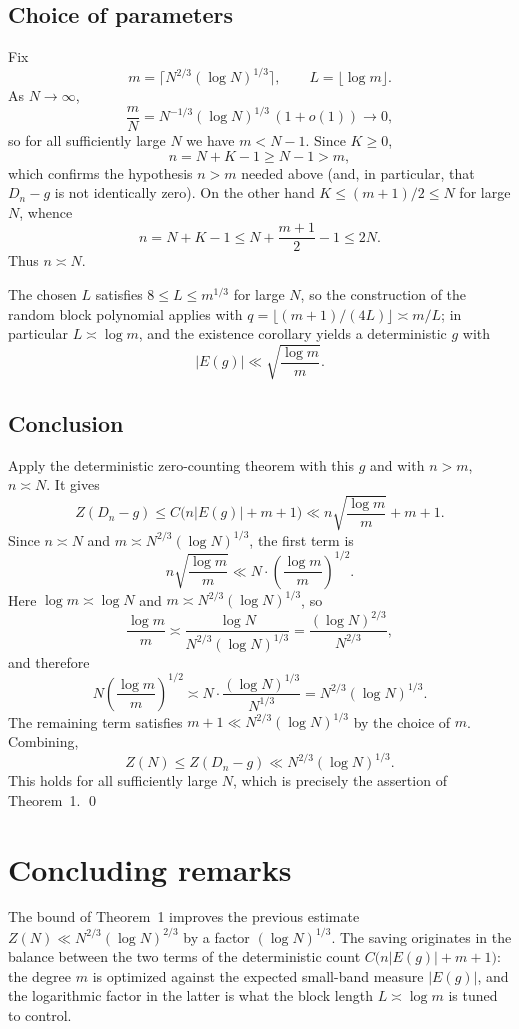 \documentclass[11pt,reqno]{amsart}
\theoremstyle{plain}
\theoremstyle{definition}
\theoremstyle{remark}
\begin{document}
\subsection*{Choice of parameters}

Fix
\[
m=\big\lceil N^{2/3}(\log N)^{1/3}\big\rceil,\qquad L=\lfloor\log m\rfloor .
\]
As $N\to\infty$,
\[
\frac{m}{N}=N^{-1/3}(\log N)^{1/3}\,(1+o(1))\longrightarrow 0,
\]
so for all sufficiently large $N$ we have $m<N-1$. Since $K\ge 0$,
\[
n=N+K-1\ge N-1>m,
\]
which confirms the hypothesis $n>m$ needed above (and, in particular, that $D_n-g$ is not identically zero). On the other hand $K\le (m+1)/2\le N$ for large $N$, whence
\[
n=N+K-1\le N+\frac{m+1}{2}-1\le 2N.
\]
Thus $n\asymp N$.

The chosen $L$ satisfies $8\le L\le m^{1/3}$ for large $N$, so the construction of the random block polynomial applies with $q=\lfloor (m+1)/(4L)\rfloor\asymp m/L$; in particular $L\asymp\log m$, and the existence corollary yields a deterministic $g$ with
\[
\lvert E(g)\rvert\ll\sqrt{\frac{\log m}{m}}.
\]

\subsection*{Conclusion}

Apply the deterministic zero-counting theorem with this $g$ and with $n>m$, $n\asymp N$. It gives
\[
Z(D_n-g)\le C\big(n\lvert E(g)\rvert+m+1\big)\ll n\sqrt{\frac{\log m}{m}}+m+1.
\]
Since $n\asymp N$ and $m\asymp N^{2/3}(\log N)^{1/3}$, the first term is
\[
n\sqrt{\frac{\log m}{m}}\ll N\cdot\left(\frac{\log m}{m}\right)^{1/2}.
\]
Here $\log m\asymp\log N$ and $m\asymp N^{2/3}(\log N)^{1/3}$, so
\[
\frac{\log m}{m}\asymp\frac{\log N}{N^{2/3}(\log N)^{1/3}}=\frac{(\log N)^{2/3}}{N^{2/3}},
\]
and therefore
\[
N\left(\frac{\log m}{m}\right)^{1/2}\asymp N\cdot\frac{(\log N)^{1/3}}{N^{1/3}}=N^{2/3}(\log N)^{1/3}.
\]
The remaining term satisfies $m+1\ll N^{2/3}(\log N)^{1/3}$ by the choice of $m$. Combining,
\[
Z(N)\le Z(D_n-g)\ll N^{2/3}(\log N)^{1/3}.
\]
This holds for all sufficiently large $N$, which is precisely the assertion of Theorem~1. \qed

\section{Concluding remarks}

The bound of Theorem~1 improves the previous estimate $Z(N)\ll N^{2/3}(\log N)^{2/3}$ by a factor $(\log N)^{1/3}$. The saving originates in the balance between the two terms of the deterministic count $C\big(n\lvert E(g)\rvert+m+1\big)$: the degree $m$ is optimized against the expected small-band measure $\lvert E(g)\rvert$, and the logarithmic factor in the latter is what the block length $L\asymp\log m$ is tuned to control.
\end{document}
